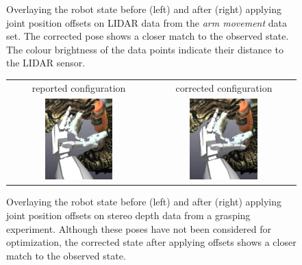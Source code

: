 \begin{figure}
\begin{tabular}{c:c}
\end{tabular}
\caption[Calibrated pose on LIAR data]{Overlaying the robot state before (left) and after (right) applying joint position offsets on LIDAR data from the \textit{arm movement} data set. The corrected pose shows a closer match to the observed state. The colour brightness of the data points indicate their distance to the LIDAR sensor.}
\label{fig:lidar_corrected_state}
\end{figure}


\begin{figure}
\centering
\begin{tabular}{c:c}
reported configuration & corrected configuration \\
\includegraphics[width=0.5\textwidth]{images/offset/visual_verification/rep_grasp.png} & \includegraphics[width=0.5\textwidth]{images/offset/visual_verification/corr_grasp.png} \\
\end{tabular}
\caption[Calibrated pose on stereo depth data]{Overlaying the robot state before (left) and after (right) applying joint position offsets on stereo depth data from a grasping experiment. Although these poses have not been considered for optimization, the corrected state after applying offsets shows a closer match to the observed state.}
\label{fig:stereo_corrected_state}
\end{figure}



